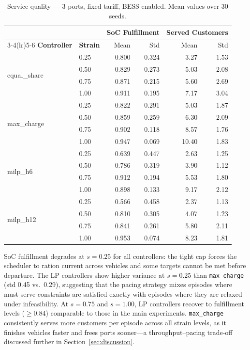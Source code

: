\begin{table}[!htb]
\centering
\caption{Service quality — 3 ports, fixed tariff, BESS enabled.
         Mean values over 30 seeds.}
\label{tab:gc_service_fixed}
\setlength{\tabcolsep}{5pt}
\begin{tabular}{ll rr rr}
\toprule
 & & \multicolumn{2}{c}{\textbf{SoC Fulfillment}} & \multicolumn{2}{c}{\textbf{Served Customers}} \\
\cmidrule(lr){3-4}\cmidrule(lr){5-6}
\textbf{Controller} & \textbf{Strain} & Mean & Std & Mean & Std \\
\midrule
\multirow{4}{*}{equal\_share}
  & 0.25 & 0.800 & 0.324 &  3.27 & 1.53 \\
  & 0.50 & 0.829 & 0.273 &  5.03 & 2.08 \\
  & 0.75 & 0.871 & 0.215 &  5.60 & 2.69 \\
  & 1.00 & 0.911 & 0.195 &  7.17 & 3.04 \\
\midrule
\multirow{4}{*}{max\_charge}
  & 0.25 & 0.822 & 0.291 &  5.03 & 1.87 \\
  & 0.50 & 0.859 & 0.259 &  6.30 & 2.09 \\
  & 0.75 & 0.902 & 0.118 &  8.57 & 1.76 \\
  & 1.00 & 0.947 & 0.069 & 10.40 & 1.83 \\
\midrule
\multirow{4}{*}{milp\_h6}
  & 0.25 & 0.639 & 0.447 &  2.63 & 1.25 \\
  & 0.50 & 0.786 & 0.319 &  3.90 & 1.12 \\
  & 0.75 & 0.912 & 0.194 &  5.53 & 1.80 \\
  & 1.00 & 0.898 & 0.133 &  9.17 & 2.12 \\
\midrule
\multirow{4}{*}{milp\_h12}
  & 0.25 & 0.566 & 0.458 &  2.37 & 1.13 \\
  & 0.50 & 0.810 & 0.305 &  4.07 & 1.23 \\
  & 0.75 & 0.841 & 0.261 &  5.80 & 2.11 \\
  & 1.00 & 0.953 & 0.074 &  8.23 & 1.81 \\
\bottomrule
\end{tabular}
\end{table}

SoC fulfillment degrades at $s=0.25$ for all controllers: the tight cap forces
the scheduler to ration current across vehicles and some targets cannot be met
before departure.  The LP controllers show higher variance at $s=0.25$ than
\texttt{max\_charge} (std 0.45 vs.\ 0.29), suggesting that the pacing strategy
mixes episodes where must-serve constraints are satisfied exactly with episodes
where they are relaxed under infeasibility.  At $s=0.75$ and $s=1.00$, LP
controllers recover to fulfillment levels ($\geq 0.84$) comparable to those
in the main experiments.  \texttt{max\_charge} consistently serves more
customers per episode across all strain levels, as it finishes vehicles faster
and frees ports sooner—a throughput–pacing trade-off discussed further in
Section~\ref{sec:discussion}.

